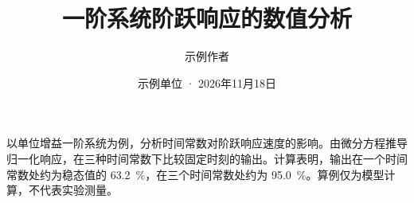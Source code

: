 \documentclass[UTF8,a4paper,zihao=-4,scheme=chinese,fontset=fandol]{ctexart}
\title{一阶系统阶跃响应的数值分析}
\author{示例作者}
\date{示例单位 · 2026年11月18日}
\begin{document}
\maketitle

\begin{reportabstract}
以单位增益一阶系统为例，分析时间常数对阶跃响应速度的影响。由微分方程推导归一化响应，在三种时间常数下比较固定时刻的输出。计算表明，输出在一个时间常数处约为稳态值的 \qty{63.2}{\percent}，在三个时间常数处约为 \qty{95.0}{\percent}。算例仅为模型计算，不代表实验测量。

\end{reportabstract}






\printbibliography[title={参考文献}]
\end{document}
